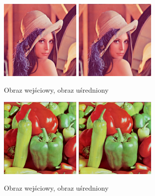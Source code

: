 \documentclass[final,a4paper,openany,12pt]{mwbk}
\begin{document}
\begin{figure}[H]
	\begin{center}
		\includegraphics[width=0.35\textwidth]{lena_color}
		\includegraphics[width=0.35\textwidth]{lena_color_lowpassAvg_result}
	\end{center}
	\caption{Obraz wejściowy, obraz uśredniony}
\end{figure}

\begin{figure}[H]
	\begin{center}
		\includegraphics[width=0.35\textwidth]{peppers_color}
		\includegraphics[width=0.35\textwidth]{peppers_color_lowpassAvg_result}
	\end{center}
	\caption{Obraz wejściowy, obraz uśredniony}
\end{figure}
\newpage
\end{document}
